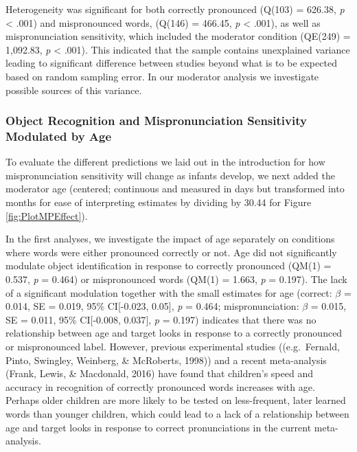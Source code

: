 \documentclass[
  man, noextraspace]{apa6}
\begin{document}
Heterogeneity was significant for both correctly pronounced (Q(103) = 626.38, \emph{p} \textless{} .001) and mispronounced words, (Q(146) = 466.45, \emph{p} \textless{} .001), as well as mispronunciation sensitivity, which included the moderator condition (QE(249) = 1,092.83, \emph{p} \textless{} .001). This indicated that the sample contains unexplained variance leading to significant difference between studies beyond what is to be expected based on random sampling error. In our moderator analysis we investigate possible sources of this variance.

\hypertarget{object-recognition-and-mispronunciation-sensitivity-modulated-by-age}{%
\subsubsection{Object Recognition and Mispronunciation Sensitivity Modulated by Age}\label{object-recognition-and-mispronunciation-sensitivity-modulated-by-age}}

To evaluate the different predictions we laid out in the introduction for how mispronunciation sensitivity will change as infants develop, we next added the moderator age (centered; continuous and measured in days but transformed into months for ease of interpreting estimates by dividing by 30.44 for Figure \ref{fig:PlotMPEffect}).

In the first analyses, we investigate the impact of age separately on conditions where words were either pronounced correctly or not. Age did not significantly modulate object identification in response to correctly pronounced (QM(1) = 0.537, \emph{p} = 0.464) or mispronounced words (QM(1) = 1.663, \emph{p} = 0.197). The lack of a significant modulation together with the small estimates for age (correct: \(\beta\) = 0.014, SE = 0.019, 95\% CI{[}-0.023, 0.05{]}, \emph{p} = 0.464; mispronunciation: \(\beta\) = 0.015, SE = 0.011, 95\% CI{[}-0.008, 0.037{]}, \emph{p} = 0.197) indicates that there was no relationship between age and target looks in response to a correctly pronounced or mispronounced label. However, previous experimental studies ((e.g.~Fernald, Pinto, Swingley, Weinberg, \& McRoberts, 1998)) and a recent meta-analysis (Frank, Lewis, \& Macdonald, 2016) have found that children's speed and accuracy in recognition of correctly pronounced words increases with age. Perhaps older children are more likely to be tested on less-frequent, later learned words than younger children, which could lead to a lack of a relationship between age and target looks in response to correct pronunciations in the current meta-analysis.
\end{document}
